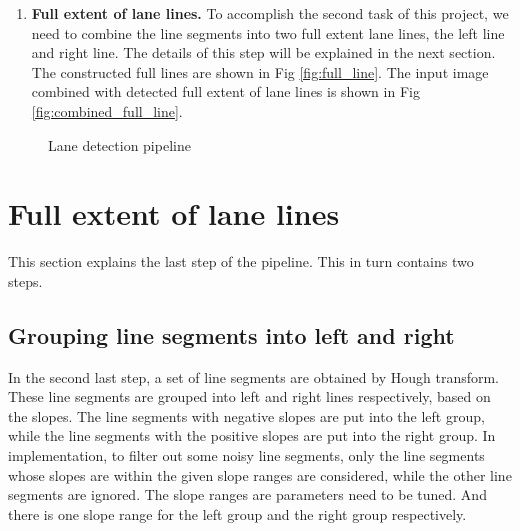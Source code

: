 \documentclass[12pt]{article}
\begin{document}
\begin{enumerate}
	\item \textbf{Full extent of lane lines.} To accomplish the second task of this project, we need to combine the line segments into two full extent lane lines, the left line and right line. The details of this step will be explained in the next section. The constructed full lines are shown in Fig \ref{fig:full_line}. The input image combined with detected full extent of lane lines is shown in Fig \ref{fig:combined_full_line}.
\end{enumerate}

\begin{figure}[h]
\centering
{}
\qquad
{}
\caption{Lane detection pipeline}
\end{figure}

\section{Full extent of lane lines}
This section explains the last step of the pipeline. This in turn contains two steps. 

\subsection{Grouping line segments into left and right}
In the second last step, a set of line segments are obtained by Hough transform. These line segments are grouped into left and right lines respectively, based on the slopes. The line segments with negative slopes are put into the left group, while the line segments with the positive slopes are put into the right group. In implementation, to filter out some noisy line segments, only the line segments whose slopes are within the given slope ranges are considered, while the other line segments are ignored. The slope ranges are parameters need to be tuned. And there is one slope range for the left group and the right group respectively.
\end{document}
